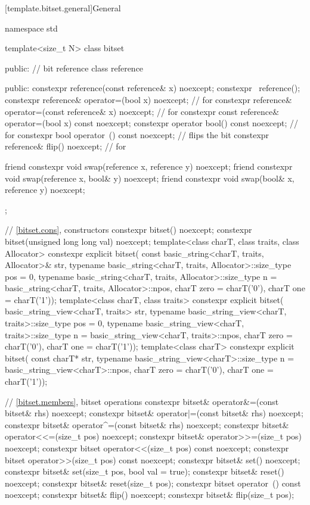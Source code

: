 [template.bitset.general]{General}%
%
\begin{codeblock}
namespace std {
  template<size_t N> class bitset {
  public:
    // bit reference
    class reference {
    public:
      constexpr reference(const reference& x) noexcept;
      constexpr ~reference();
      constexpr reference& operator=(bool x) noexcept;              // for 
      constexpr reference& operator=(const reference& x) noexcept;  // for 
      constexpr const reference& operator=(bool x) const noexcept;
      constexpr operator bool() const noexcept;                     // for 
      constexpr bool operator~() const noexcept;                    // flips the bit
      constexpr reference& flip() noexcept;                         // for 

      friend constexpr void swap(reference x, reference y) noexcept;
      friend constexpr void swap(reference x, bool& y) noexcept;
      friend constexpr void swap(bool& x, reference y) noexcept;
    };

    // \ref{bitset.cons}, constructors
    constexpr bitset() noexcept;
    constexpr bitset(unsigned long long val) noexcept;
    template<class charT, class traits, class Allocator>
      constexpr explicit bitset(
        const basic_string<charT, traits, Allocator>& str,
        typename basic_string<charT, traits, Allocator>::size_type pos = 0,
        typename basic_string<charT, traits, Allocator>::size_type n
          = basic_string<charT, traits, Allocator>::npos,
        charT zero = charT('0'),
        charT one = charT('1'));
    template<class charT, class traits>
      constexpr explicit bitset(
        basic_string_view<charT, traits> str,
        typename basic_string_view<charT, traits>::size_type pos = 0,
        typename basic_string_view<charT, traits>::size_type n
          = basic_string_view<charT, traits>::npos,
        charT zero = charT('0'),
        charT one = charT('1'));
    template<class charT>
      constexpr explicit bitset(
        const charT* str,
        typename basic_string_view<charT>::size_type n = basic_string_view<charT>::npos,
        charT zero = charT('0'),
        charT one = charT('1'));

    // \ref{bitset.members}, bitset operations
    constexpr bitset& operator&=(const bitset& rhs) noexcept;
    constexpr bitset& operator|=(const bitset& rhs) noexcept;
    constexpr bitset& operator^=(const bitset& rhs) noexcept;
    constexpr bitset& operator<<=(size_t pos) noexcept;
    constexpr bitset& operator>>=(size_t pos) noexcept;
    constexpr bitset  operator<<(size_t pos) const noexcept;
    constexpr bitset  operator>>(size_t pos) const noexcept;
    constexpr bitset& set() noexcept;
    constexpr bitset& set(size_t pos, bool val = true);
    constexpr bitset& reset() noexcept;
    constexpr bitset& reset(size_t pos);
    constexpr bitset  operator~() const noexcept;
    constexpr bitset& flip() noexcept;
    constexpr bitset& flip(size_t pos);

}}
\end{codeblock}
